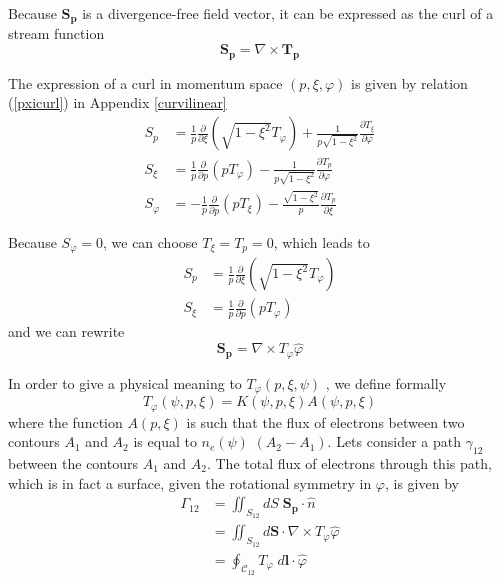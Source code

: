 Because $\mathbf{S}_{\mathbf{p}}$ is a divergence-free field vector, it can
be expressed as the curl of a stream function
\begin{equation}
\mathbf{S}_{\mathbf{p}}=\nabla\times\mathbf{T}_{\mathbf{p}}
\end{equation}

The expression of a curl in momentum space $\left( p,\xi,\varphi\right) $ is
given by relation (\ref{pxicurl}) in Appendix \ref{curvilinear}
\begin{align}
S_{p} & =\frac{1}{p}\frac{\partial}{\partial\xi}\left( \sqrt{1-\xi^{2}}
T_{\varphi}\right) +\frac{1}{p\sqrt{1-\xi^{2}}}\frac{\partial T_{\xi}}{
\partial\varphi} \\
S_{\xi} & =\frac{1}{p}\frac{\partial}{\partial p}\left( pT_{\varphi}\right) -%
\frac{1}{p\sqrt{1-\xi^{2}}}\frac{\partial T_{p}}{\partial\varphi} \\
S_{\varphi} & =-\frac{1}{p}\frac{\partial}{\partial p}\left( pT_{\xi
}\right) -\frac{\sqrt{1-\xi^{2}}}{p}\frac{\partial T_{p}}{\partial\xi}
\end{align}

Because $S_{\varphi}=0$, we can choose $T_{\xi}=T_{p}=0$, which leads to
\begin{align}
S_{p} & =\frac{1}{p}\frac{\partial}{\partial\xi}\left( \sqrt{1-\xi^{2}}
T_{\varphi}\right) \\
S_{\xi} & =\frac{1}{p}\frac{\partial}{\partial p}\left( pT_{\varphi}\right)
\end{align}
and we can rewrite
\begin{equation}
\mathbf{S}_{\mathbf{p}}=\nabla\times T_{\varphi}\widehat{\varphi}
\end{equation}

In order to give a physical meaning to $T_{\varphi}\left( p,\xi,\psi\right) $%
, we define formally
\begin{equation}
T_{\varphi}\left( \psi,p,\xi\right) =K\left( \psi,p,\xi\right) A\left(
\psi,p,\xi\right)
\end{equation}
where the function $A\left( p,\xi\right) $ is such that the flux of
electrons between two contours $A_{1}$ and $A_{2}$ is equal to $n_{e}\left(
\psi\right) $ $\left( A_{2}-A_{1}\right) $. Lets consider a path $%
\gamma_{12} $ between the contours $A_{1}$ and $A_{2}$. The total flux of
electrons through this path, which is in fact a surface, given the
rotational symmetry in $\varphi$, is given by
\begin{align}
\Gamma_{12} & =\iint_{S_{12}}dS\;\mathbf{S}_{\mathbf{p}}\cdot\widehat {n}
\nonumber \\
& =\iint_{S_{12}}d\mathbf{S}\cdot\nabla\times T_{\varphi}\widehat{\varphi }
\nonumber \\
& =\oint_{\mathcal{C}_{12}}T_{\varphi}\;d\mathbf{l}\cdot\widehat{\varphi}
\end{align}

